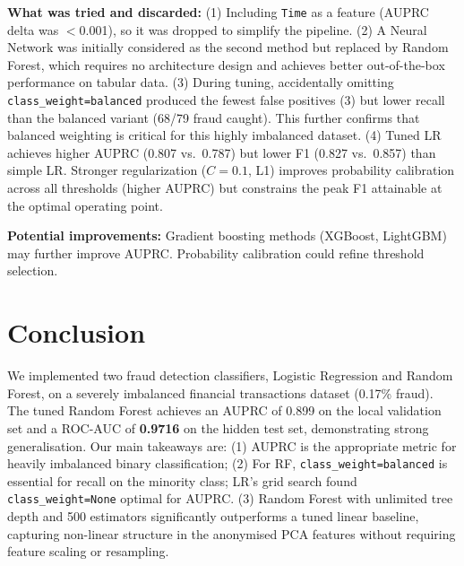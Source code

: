 \documentclass[a4, 10 pt, conference]{ieeeconf}
\begin{document}
\textbf{What was tried and discarded:}
(1) Including \texttt{Time} as a feature (AUPRC delta was $<$0.001), so it was
dropped to simplify the pipeline.
(2) A Neural Network was initially considered as the second method but replaced
by Random Forest, which requires no architecture design and achieves better
out-of-the-box performance on tabular data.
(3) During tuning, accidentally omitting \texttt{class\_weight=balanced}
produced the fewest false positives (3) but lower recall than the balanced
variant (68/79 fraud caught). This further confirms that balanced weighting is
critical for this highly imbalanced dataset.
(4) Tuned LR achieves higher AUPRC (0.807 vs.\ 0.787) but lower F1 (0.827 vs.\
0.857) than simple LR. Stronger regularization ($C=0.1$, L1) improves
probability calibration across all thresholds (higher AUPRC) but constrains the
peak F1 attainable at the optimal operating point.

\textbf{Potential improvements:}
Gradient boosting methods (XGBoost, LightGBM) may further improve AUPRC.
Probability calibration could refine threshold selection.

\section{Conclusion}
\label{sec:con}

We implemented two fraud detection classifiers, Logistic Regression and
Random Forest, on a severely imbalanced financial transactions dataset
(0.17\% fraud). The tuned Random Forest achieves an AUPRC of 0.899 on the
local validation set and a ROC-AUC of \textbf{0.9716} on the hidden test set,
demonstrating strong generalisation. Our main takeaways are:
(1) AUPRC is the appropriate metric for heavily imbalanced binary classification;
(2) For RF, \texttt{class\_weight=balanced} is essential for recall on the
minority class; LR's grid search found \texttt{class\_weight=None} optimal for
AUPRC.
(3) Random Forest with unlimited tree depth and 500 estimators significantly
outperforms a tuned linear baseline, capturing non-linear structure in the
anonymised PCA features without requiring feature scaling or resampling.
\end{document}
